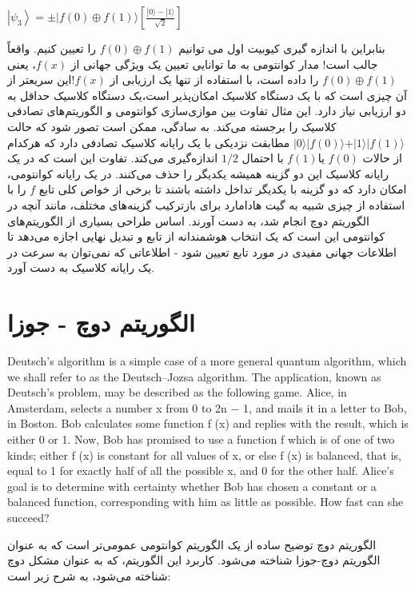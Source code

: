 \documentclass{book}
\begin{document}
\begin{center}
	$\left|\psi_3\right\rangle= \pm|f(0) \oplus f(1)\rangle\left[\frac{|0\rangle-|1\rangle}{\sqrt{2}}\right]$
\end{center}
بنابراین با اندازه گیری کیوبیت اول می توانیم $f(0) \oplus f(1)$ را تعیین کنیم. واقعاً جالب است! مدار کوانتومی به ما توانایی تعیین یک ویژگی جهانی از $f(x)$، یعنی$ f(0)\oplus f(1)$ را داده است، با استفاده از تنها یک ارزیابی از $f(x)$!این سریعتر از آن چیزی است که با یک دستگاه کلاسیک امکان‌پذیر است،یک دستگاه کلاسیک حداقل به دو ارزیابی نیاز دارد.
این مثال تفاوت بین موازی‌سازی کوانتومی و الگوریتم‌های تصادفی کلاسیک را برجسته می‌کند. به سادگی، ممکن است تصور شود که حالت $\vert0\rangle \vert f(0) \rangle + \vert1\rangle \vert f(1) \rangle$ مطابقت نزدیکی با یک رایانه کلاسیک تصادفی دارد که هرکدام از حالات $ f (0)$ یا$ f (1) $ با احتمال $1/2$ اندازه‌گیری می‌کند.
تفاوت این است که در یک رایانه کلاسیک این دو گزینه همیشه یکدیگر را حذف می‌کنند. در یک رایانه کوانتومی، امکان دارد که دو گزینه با یکدیگر تداخل داشته باشند تا برخی از خواص کلی تابع $f$ را با استفاده از چیزی شبیه به گیت هادامارد برای بازترکیب گزینه‌های مختلف، مانند آنچه در الگوریتم دوچ انجام شد، به دست آورند.
اساس طراحی بسیاری از الگوریتم‌های کوانتومی این است که یک انتخاب هوشمندانه از تابع و تبدیل نهایی اجازه می‌دهد تا اطلاعات جهانی مفیدی در مورد تابع تعیین شود - اطلاعاتی که نمی‌توان به سرعت در یک رایانه کلاسیک به دست آورد.

\section{الگوریتم دوچ - جوزا}
Deutsch’s algorithm is a simple case of a more general quantum algorithm, which we shall
refer to as the Deutsch–Jozsa algorithm. The application, known as Deutsch’s problem,
may be described as the following game. Alice, in Amsterdam, selects a number x from
0 to 2n − 1, and mails it in a letter to Bob, in Boston. Bob calculates some function
f (x) and replies with the result, which is either 0 or 1. Now, Bob has promised to use
a function f which is of one of two kinds; either f (x) is constant for all values of x,
or else f (x) is balanced, that is, equal to 1 for exactly half of all the possible x, and 0
for the other half. Alice’s goal is to determine with certainty whether Bob has chosen a
constant or a balanced function, corresponding with him as little as possible. How fast
can she succeed?

الگوریتم دوچ توضیح ساده از یک الگوریتم کوانتومی عمومی‌تر است که به عنوان الگوریتم دوچ-جوزا شناخته می‌شود. کاربرد این الگوریتم، که به عنوان مشکل دوچ شناخته می‌شود، به شرح زیر است:
\end{document}
